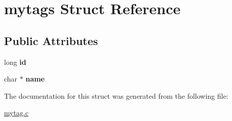 \hypertarget{structmytags}{}\section{mytags Struct Reference}
\label{structmytags}
\subsection*{Public Attributes}
\begin{DoxyCompactItemize}
\item 
long {\bfseries id}\hypertarget{structmytags_a6be4470773454d6157c74b1939bbca8e}{}\label{structmytags_a6be4470773454d6157c74b1939bbca8e}

\item 
char $\ast$ {\bfseries name}\hypertarget{structmytags_abdcf60cd59b950b1fe9686830ec156d1}{}\label{structmytags_abdcf60cd59b950b1fe9686830ec156d1}

\end{DoxyCompactItemize}


The documentation for this struct was generated from the following file\+:\begin{DoxyCompactItemize}
\item 
\hyperlink{mytag_8c}{mytag.\+c}\end{DoxyCompactItemize}
